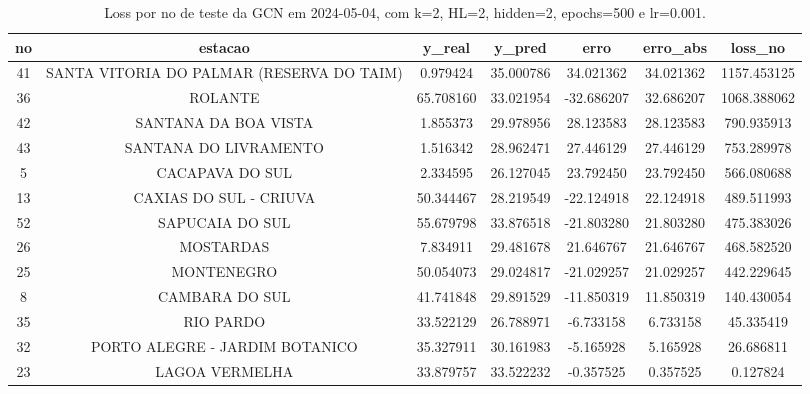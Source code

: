 \begin{table}[h]
\centering
\caption{Loss por no de teste da GCN em 2024-05-04, com k=2, HL=2, hidden=2, epochs=500 e lr=0.001.}
\label{tab:gcn_loss_k2_hl2_h2_e500_d20240504}
\begin{tabular}{ccccccc}
\toprule
no & estacao & y\_real & y\_pred & erro & erro\_abs & loss\_no \\
\midrule
41 & SANTA VITORIA DO PALMAR (RESERVA DO TAIM) & 0.979424 & 35.000786 & 34.021362 & 34.021362 & 1157.453125 \\
36 & ROLANTE & 65.708160 & 33.021954 & -32.686207 & 32.686207 & 1068.388062 \\
42 & SANTANA DA BOA VISTA & 1.855373 & 29.978956 & 28.123583 & 28.123583 & 790.935913 \\
43 & SANTANA DO LIVRAMENTO & 1.516342 & 28.962471 & 27.446129 & 27.446129 & 753.289978 \\
5 & CACAPAVA DO SUL & 2.334595 & 26.127045 & 23.792450 & 23.792450 & 566.080688 \\
13 & CAXIAS DO SUL - CRIUVA & 50.344467 & 28.219549 & -22.124918 & 22.124918 & 489.511993 \\
52 & SAPUCAIA DO SUL & 55.679798 & 33.876518 & -21.803280 & 21.803280 & 475.383026 \\
26 & MOSTARDAS & 7.834911 & 29.481678 & 21.646767 & 21.646767 & 468.582520 \\
25 & MONTENEGRO & 50.054073 & 29.024817 & -21.029257 & 21.029257 & 442.229645 \\
8 & CAMBARA DO SUL & 41.741848 & 29.891529 & -11.850319 & 11.850319 & 140.430054 \\
35 & RIO PARDO & 33.522129 & 26.788971 & -6.733158 & 6.733158 & 45.335419 \\
32 & PORTO ALEGRE - JARDIM BOTANICO & 35.327911 & 30.161983 & -5.165928 & 5.165928 & 26.686811 \\
23 & LAGOA VERMELHA & 33.879757 & 33.522232 & -0.357525 & 0.357525 & 0.127824 \\
\bottomrule
\end{tabular}
\end{table}
